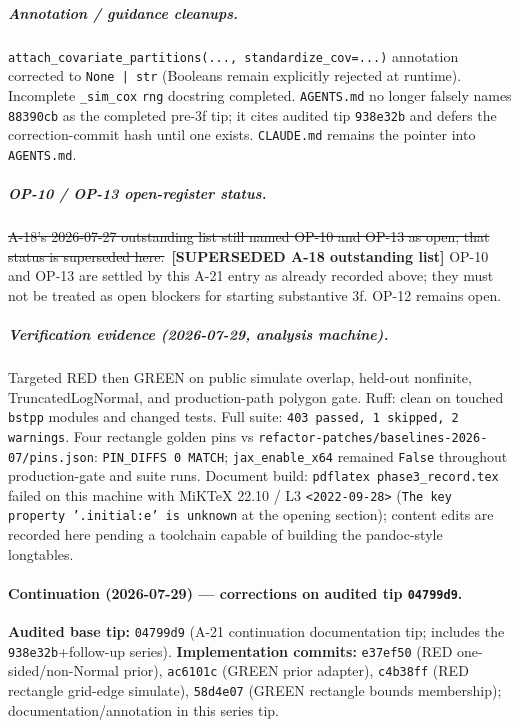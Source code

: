 \documentclass[
  10pt,
]{article}
\newcommand{\amdstrike}[1]{\sout{#1}}
\newcommand{\amdstrike}[1]{\textcolor{supcolor}{#1}}
\newcommand{\supsd}[2]{{\color{supcolor}\amdstrike{#2}}~{\color{amdcolor}\footnotesize\textbf{[SUPERSEDED #1]}}}
\begin{document}
\subparagraph{Annotation / guidance cleanups.}
\texttt{attach\_covariate\_partitions(..., standardize\_cov=...)} annotation corrected to \texttt{None | str} (Booleans remain explicitly rejected at runtime).
Incomplete \texttt{\_sim\_cox} \texttt{rng} docstring completed.
\texttt{AGENTS.md} no longer falsely names \texttt{88390cb} as the completed pre-3f tip; it cites audited tip \texttt{938e32b} and defers the correction-commit hash until one exists.
\texttt{CLAUDE.md} remains the pointer into \texttt{AGENTS.md}.

\subparagraph{OP-10 / OP-13 open-register status.}
\supsd{A-18 outstanding list}{A-18's 2026-07-27 outstanding list still named OP-10 and OP-13 as open; that status is superseded here.}
OP-10 and OP-13 are settled by this A-21 entry as already recorded above; they must not be treated as open blockers for starting substantive 3f.
OP-12 remains open.

\subparagraph{Verification evidence (2026-07-29, analysis machine).}
Targeted RED then GREEN on public simulate overlap, held-out nonfinite, TruncatedLogNormal, and production-path polygon gate.
Ruff: clean on touched \texttt{bstpp} modules and changed tests.
Full suite: \texttt{403 passed, 1 skipped, 2 warnings}.
Four rectangle golden pins vs \texttt{refactor-patches/baselines-2026-07/pins.json}: \texttt{PIN\_DIFFS 0 MATCH}; \texttt{jax\_enable\_x64} remained \texttt{False} throughout production-gate and suite runs.
Document build: \texttt{pdflatex phase3\_record.tex} failed on this machine with MiKTeX 22.10 / L3 \texttt{<2022-09-28>} (\texttt{The key property '.initial:e' is unknown} at the opening section); content edits are recorded here pending a toolchain capable of building the pandoc-style longtables.

\paragraph{Continuation (2026-07-29) --- corrections on audited tip \texttt{04799d9}.}
\textbf{Audited base tip:} \texttt{04799d9} (A-21 continuation documentation tip; includes the \texttt{938e32b}+follow-up series).
\textbf{Implementation commits:} \texttt{e37ef50} (RED one-sided/non-Normal prior), \texttt{ac6101c} (GREEN prior adapter), \texttt{c4b38ff} (RED rectangle grid-edge simulate), \texttt{58d4e07} (GREEN rectangle bounds membership); documentation/annotation in this series tip.
\end{document}
